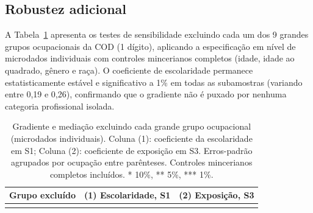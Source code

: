\subsection{Robustez adicional}
\label{ap:robustez}

A Tabela~\ref{tab:robustezgrupos} apresenta os testes de sensibilidade excluindo cada um dos 9 grandes grupos ocupacionais da COD (1 dígito), aplicando a especificação em nível de microdados individuais com controles mincerianos completos (idade, idade ao quadrado, gênero e raça). O coeficiente de escolaridade permanece estatisticamente estável e significativo a 1\% em todas as subamostras (variando entre 0,19 e 0,26), confirmando que o gradiente não é puxado por nenhuma categoria profissional isolada.

\begin{table}[htbp]
\centering
\caption{Gradiente e mediação excluindo cada grande grupo ocupacional (microdados individuais). Coluna (1): coeficiente da escolaridade em S1; Coluna (2): coeficiente de exposição em S3. Erros-padrão agrupados por ocupação entre parênteses. Controles mincerianos completos incluídos. * 10\%, ** 5\%, *** 1\%.}
\label{tab:robustezgrupos}
\begin{tabular}{lcc}
\toprule
Grupo excluído & (1) Escolaridade, S1 & (2) Exposição, S3 \\
\midrule
 \\
\bottomrule
\end{tabular}
\end{table}
